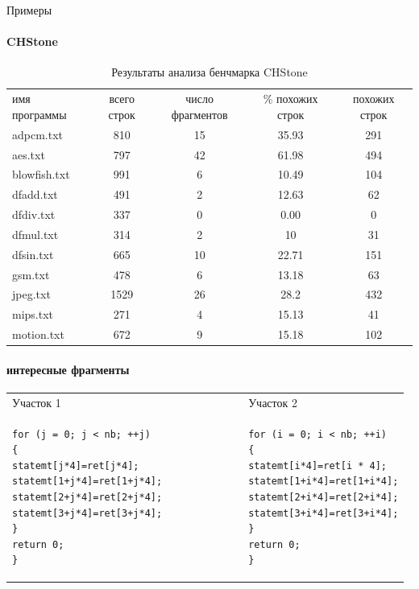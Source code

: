 \documentclass{beamer}              %
\begin{document}
\begin{frame}{Примеры}
  \framesubtitle{CHStone}
  \begin{table}[htp]
	\begin{centering}
\begin{tabular}{ l c c c c }
\hline
имя программы & всего строк & число фрагментов & \% похожих строк & похожих строк \\
adpcm.txt &	810 &	15	& 35.93 &	291 \\
aes.txt &	797 &	42 &	61.98 &	494     \\
blowfish.txt &	991 &	6 &	10.49 &	104 \\
dfadd.txt &	491 &	2 &	12.63 &	62   \\
dfdiv.txt &	337 &	0 &	0.00 &	0   \\
dfmul.txt &	314 &	2 &	10 &	31  \\
dfsin.txt & 	665 &	10 &	22.71 &	151 \\
gsm.txt	& 478 &	6 &	13.18 &	63      \\
jpeg.txt &	1529 &	26 &	28.2 &	432 \\
mips.txt &	271 &	4 &	15.13 &	41   \\
motion.txt &	672 &	9 &	 15.18 &	102 \\
\hline
\end{tabular}
\caption{Результаты анализа бенчмарка CHStone}
\label{tab:CHStone}
\end{centering}
\end{table}
\end{frame}

\begin{frame}[fragile]
  \framesubtitle{интересные фрагменты}
  
\noindent
\begin{tabular}{|p{6cm}|p{6cm}|}
Участок 1  &  Участок 2 \\
\begin{lstlisting}
for (j = 0; j < nb; ++j)               
{                                      
statemt[j*4]=ret[j*4];           
statemt[1+j*4]=ret[1+j*4];   
statemt[2+j*4]=ret[2+j*4];   
statemt[3+j*4]=ret[3+j*4];   
}                                      
return 0;                              
}                                      
\end{lstlisting}&
\begin{lstlisting}
for (i = 0; i < nb; ++i)
{
statemt[i*4]=ret[i * 4];
statemt[1+i*4]=ret[1+i*4];
statemt[2+i*4]=ret[2+i*4];
statemt[3+i*4]=ret[3+i*4];
}
return 0;
}
\end{lstlisting}
\end{tabular} 
\label{clone_listing_ex}
  
\end{frame}
\end{document}
